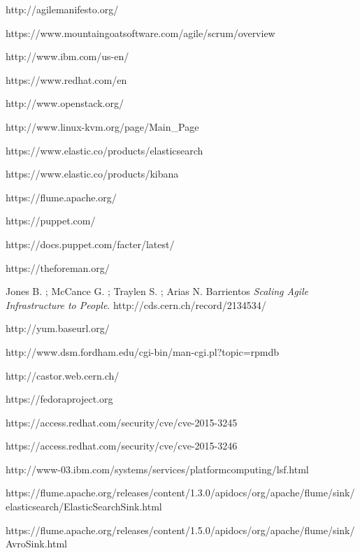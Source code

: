 
\begin{thebibliography}{90}
\rhead[\fancyplain{}{\bfseries \leftmark}]{\fancyplain{}{\bfseries
\thepage}}

http://agilemanifesto.org/

https://www.mountaingoatsoftware.com/agile/scrum/overview

http://www.ibm.com/us-en/

https://www.redhat.com/en

http://www.openstack.org/

http://www.linux-kvm.org/page/Main\_Page

https://www.elastic.co/products/elasticsearch

https://www.elastic.co/products/kibana

https://flume.apache.org/

https://puppet.com/

https://docs.puppet.com/facter/latest/

https://theforeman.org/

Jones B. ; McCance G. ; Traylen S. ; Arias N. Barrientos 
\textit{Scaling Agile Infrastructure to People}.
http://cds.cern.ch/record/2134534/

http://yum.baseurl.org/

http://www.dsm.fordham.edu/cgi-bin/man-cgi.pl?topic=rpmdb

http://castor.web.cern.ch/

https://fedoraproject.org

https://access.redhat.com/security/cve/cve-2015-3245

https://access.redhat.com/security/cve/cve-2015-3246

http://www-03.ibm.com/systems/services/platformcomputing/lsf.html

https://flume.apache.org/releases/content/1.3.0/apidocs/org/apache/flume/sink/elasticsearch/ElasticSearchSink.html

https://flume.apache.org/releases/content/1.5.0/apidocs/org/apache/flume/sink/AvroSink.html




\end{thebibliography}
